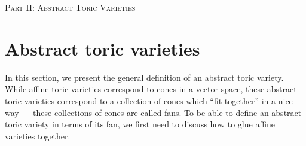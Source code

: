 \documentclass[12pt]{amsart}
\theoremstyle{plain}
\begin{document}
\newpage
{}
{}
\thispagestyle{empty} %
\vspace*{\fill} %
\begin{center}
    \Huge \textsc{Part II: Abstract Toric Varieties}
\end{center}
\vspace*{\fill} %

\newpage
\section{Abstract toric varieties}
In this section, we present the general definition of an abstract toric variety.
While affine toric varieties correspond to cones in a vector space, these abstract toric varieties correspond to a collection of cones which ``fit together'' in a nice way --- these collections of cones are called fans.
To be able to define an abstract toric variety in terms of its fan, we first need to discuss how to glue affine varieties together.
\end{document}
